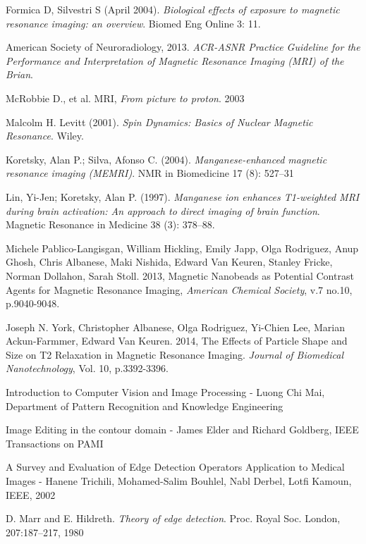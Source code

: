 \documentclass[a4paper,12pt]{article}
\begin{document}
\newpage
\singlespacing
\begin{thebibliography}{9}

Formica D, Silvestri S (April 2004). {\em Biological effects of exposure to magnetic resonance imaging: an overview}. Biomed Eng Online 3: 11. 

American Society of Neuroradiology, 2013. {\em ACR-ASNR Practice Guideline for the Performance and Interpretation of Magnetic Resonance Imaging (MRI) of the Brian}.

McRobbie D., et al. MRI, {\em From picture to proton}. 2003

Malcolm H. Levitt (2001). {\em Spin Dynamics: Basics of Nuclear Magnetic Resonance}. Wiley.

Koretsky, Alan P.; Silva, Afonso C. (2004). {\em Manganese-enhanced magnetic resonance imaging (MEMRI)}. NMR in Biomedicine 17 (8): 527–31

Lin, Yi-Jen; Koretsky, Alan P. (1997). {\em Manganese ion enhances T1-weighted MRI during brain activation: An approach to direct imaging of brain function}. Magnetic Resonance in Medicine 38 (3): 378–88.

Michele Pablico-Langisgan, William Hickling, Emily Japp, Olga Rodriguez, Anup Ghosh, Chris Albanese, Maki Nishida, Edward Van Keuren, Stanley Fricke, Norman Dollahon, Sarah Stoll. 2013, Magnetic Nanobeads as Potential Contrast Agents for Magnetic Resonance Imaging, {\em American Chemical Society}, v.7 no.10, p.9040-9048.

Joseph N. York, Christopher Albanese, Olga Rodriguez, Yi-Chien Lee, Marian Ackun-Farmmer, Edward Van Keuren. 2014, The Effects of Particle Shape and Size on T2 Relaxation in Magnetic Resonance Imaging. {\em Journal of Biomedical Nanotechnology}, Vol. 10, p.3392-3396.

Introduction to Computer Vision and Image Processing - Luong Chi Mai, Department of Pattern Recognition and Knowledge Engineering

Image Editing in the contour domain - James Elder and Richard Goldberg, IEEE Transactions on PAMI

A Survey and Evaluation of Edge Detection Operators Application to Medical Images - Hanene Trichili, Mohamed-Salim Bouhlel, Nabl Derbel, Lotfi Kamoun, IEEE, 2002

D. Marr and E. Hildreth. {\em Theory of edge detection}. Proc. Royal Soc. London, 207:187–217, 1980


\end{thebibliography}
\end{document}
